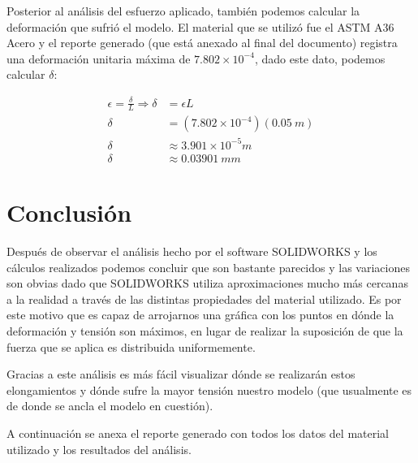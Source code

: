 \documentclass[12pt, letterpaper]{article}
\begin{document}
Posterior al análisis del esfuerzo aplicado, también podemos calcular la deformación que sufrió el modelo. El material que se utilizó fue el ASTM A36 Acero y el reporte generado (que está anexado al final del documento) registra una deformación unitaria máxima de $7.802 \times 10^{-4}$, dado este dato, podemos calcular $\delta$:

\begin{equation}
	\begin{split}
		\epsilon = \frac{\delta}{L} \Longrightarrow \delta &= \epsilon L\\
		\delta &= (7.802 \times 10^{-4})(0.05\ m)\\
		\delta &\approx 3.901 \times 10^{-5} m\\
		\delta &\approx 0.03901\ mm
	\end{split}
\end{equation}


\section*{Conclusión}
Después de observar el análisis hecho por el software SOLIDWORKS y los cálculos realizados podemos concluir que son bastante parecidos y las variaciones son obvias dado que SOLIDWORKS utiliza aproximaciones mucho más cercanas a la realidad a través de las distintas propiedades del material utilizado. Es por este motivo que es capaz de arrojarnos una gráfica con los puntos en dónde la deformación y tensión son máximos, en lugar de realizar la suposición de que la fuerza que se aplica es distribuida uniformemente.

Gracias a este análisis es más fácil visualizar dónde se realizarán estos elongamientos y dónde sufre la mayor tensión nuestro modelo (que usualmente es de donde se ancla el modelo en cuestión).

A continuación se anexa el reporte generado con todos los datos del material utilizado y los resultados del análisis.
\renewcommand\refname{Referencias}
\printbibliography
\end{document}
